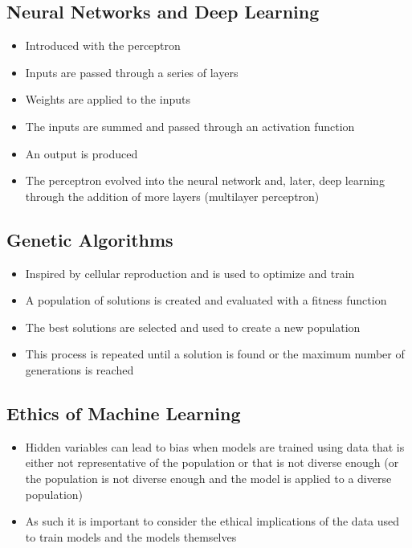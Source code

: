 \documentclass[12pt]{article}
\begin{document}
        \subsection{Neural Networks and Deep Learning}
            \begin{itemize}
                \item Introduced with the perceptron
                \item Inputs are passed through a series of layers
                \item Weights are applied to the inputs
                \item The inputs are summed and passed through an activation function
                \item An output is produced
                \item The perceptron evolved into the neural network and, later, deep learning through the addition of more layers (multilayer perceptron)
            \end{itemize}
        \subsection{Genetic Algorithms}
            \begin{itemize}
                \item Inspired by cellular reproduction and is used to optimize and train
                \item A population of solutions is created and evaluated with a fitness function
                \item The best solutions are selected and used to create a new population
                \item This process is repeated until a solution is found or the maximum number of generations is reached
            \end{itemize}
        \subsection{Ethics of Machine Learning}
            \begin{itemize}
                \item Hidden variables can lead to bias when models are trained using data that is either not representative of the population or that is not diverse enough (or the population is not diverse enough and the model is applied to a diverse population)
                \item As such it is important to consider the ethical implications of the data used to train models and the models themselves
            \end{itemize}
\end{document}
